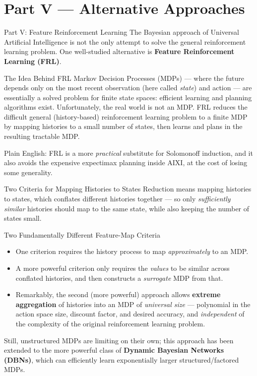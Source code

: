 \documentclass[aspectratio=169,10pt]{beamer}
\begin{document}
\section{Part V --- Alternative Approaches}

\begin{frame}{Part V: Feature Reinforcement Learning}
  The Bayesian approach of Universal Artificial Intelligence is not the only
  attempt to solve the general reinforcement learning problem. One
  well-studied alternative is \textbf{Feature Reinforcement Learning
  (FRL)}.

  \begin{block}{The Idea Behind FRL}
    Markov Decision Processes (MDPs) --- where the future depends only on
    the most recent observation (here called \emph{state}) and action --- are
    essentially a solved problem for finite state spaces: efficient learning
    and planning algorithms exist. Unfortunately, the real world is not an
    MDP. FRL reduces the difficult general (history-based) reinforcement
    learning problem to a finite MDP by mapping histories to a small number
    of states, then learns and plans in the resulting tractable MDP.
  \end{block}
  Plain English: FRL is a more \emph{practical} substitute for Solomonoff
  induction, and it also avoids the expensive expectimax planning inside
  AIXI, at the cost of losing some generality.
\end{frame}

\begin{frame}{Two Criteria for Mapping Histories to States}
  Reduction means mapping histories to states, which conflates different
  histories together --- so only \emph{sufficiently similar} histories
  should map to the same state, while also keeping the number of states
  small.

  \begin{block}{Two Fundamentally Different Feature-Map Criteria}
    \begin{itemize}
      \item One criterion requires the history process to map
        \emph{approximately} to an MDP.
      \item A more powerful criterion only requires the \emph{values} to be
        similar across conflated histories, and then constructs a
        \emph{surrogate} MDP from that.
      \item Remarkably, the second (more powerful) approach allows
        \textbf{extreme aggregation} of histories into an MDP of
        \emph{universal size} --- polynomial in the action space size,
        discount factor, and desired accuracy, and \emph{independent} of the
        complexity of the original reinforcement learning problem.
    \end{itemize}
  \end{block}
  Still, unstructured MDPs are limiting on their own; this approach has been
  extended to the more powerful class of \textbf{Dynamic Bayesian Networks
  (DBNs)}, which can efficiently learn exponentially larger
  structured/factored MDPs.
\end{frame}
\end{document}

